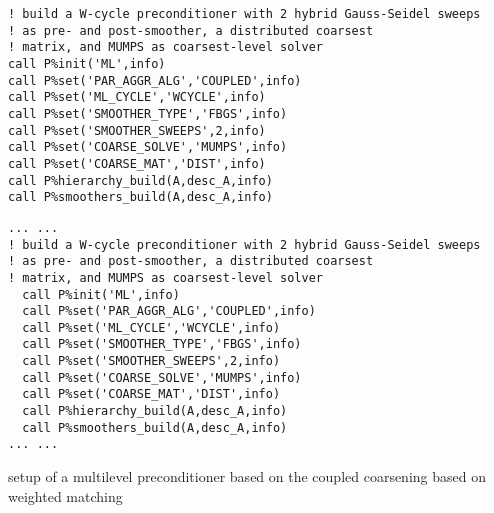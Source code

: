 \begin{listing}[h!]
\ifpdf
\begin{verbatim}
! build a W-cycle preconditioner with 2 hybrid Gauss-Seidel sweeps
! as pre- and post-smoother, a distributed coarsest
! matrix, and MUMPS as coarsest-level solver
call P%init('ML',info)
call P%set('PAR_AGGR_ALG','COUPLED',info)
call P%set('ML_CYCLE','WCYCLE',info)
call P%set('SMOOTHER_TYPE','FBGS',info)
call P%set('SMOOTHER_SWEEPS',2,info)
call P%set('COARSE_SOLVE','MUMPS',info)
call P%set('COARSE_MAT','DIST',info)
call P%hierarchy_build(A,desc_A,info)
call P%smoothers_build(A,desc_A,info)
\end{verbatim}
\else
\begin{center}
\begin{minipage}{.90\textwidth}
{\small
\begin{verbatim}
... ...
! build a W-cycle preconditioner with 2 hybrid Gauss-Seidel sweeps
! as pre- and post-smoother, a distributed coarsest
! matrix, and MUMPS as coarsest-level solver
  call P%init('ML',info)
  call P%set('PAR_AGGR_ALG','COUPLED',info)
  call P%set('ML_CYCLE','WCYCLE',info)
  call P%set('SMOOTHER_TYPE','FBGS',info)
  call P%set('SMOOTHER_SWEEPS',2,info)
  call P%set('COARSE_SOLVE','MUMPS',info)
  call P%set('COARSE_MAT','DIST',info)
  call P%hierarchy_build(A,desc_A,info)
  call P%smoothers_build(A,desc_A,info)
... ...
\end{verbatim}
}
\end{minipage}
\end{center}
\fi\vspace{-2em}%
\caption{setup of a multilevel preconditioner based on the coupled coarsening based on weighted matching\label{fig:ex3}}
\end{listing}\vspace*{-2em}
